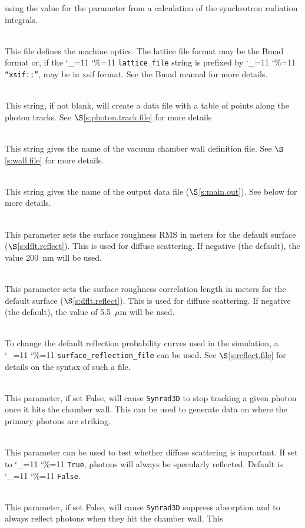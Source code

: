 \documentclass[11pt,openany]{report}
\newcommand{\sref}[1]{$\S$\ref{#1}}
\newcommand{\srthree}{\texttt{Synrad3D}\xspace}
\newcommand\ttcmd{\begingroup\catcode`\_=11 \catcode`\%=11 \dottcmd}
\newcommand\dottcmd[1]{\texttt{#1}\endgroup}
\newcommand{\vn}{\ttcmd}
\newcommand{\Newline}{\hfil \\}
\begin{document}
\begin{description}
using the value for the parameter from a calculation of the synchrotron radiation integrals.
  \item[\vn{lattice_file}] \Newline
This file defines the machine optics. The lattice file format may be
the Bmad format or, if the \vn{lattice_file} string is prefixed by
\vn{``xsif::''}, may be in xsif format. See the Bmad manual for more details.
  \item[\vn{photon_track_file}] \Newline
This string, if not blank, will create a data file with a table of points along the photon tracks.
See \sref{s:photon.track.file} for more details
  \item[\vn{wall_file}] \Newline
This string gives the name of the vacuum chamber wall definition
file. See \sref{s:wall.file} for more details.
  \item[\vn{dat_file}] \Newline
This string gives the name of the output data file (\sref{s:main.out}).
See below for more details.
  \item[\vn{surface_roughness_rms}] \Newline
This parameter sets the surface roughness RMS in meters for the
default surface (\sref{s:dflt.reflect}). This is used for diffuse
scattering.  If negative (the default), the value 200~nm will be used.
  \item[\vn{roughness_correlation_len}] \Newline
This parameter sets the surface roughness correlation length in meters
for the default surface (\sref{s:dflt.reflect}).  This is used for
diffuse scattering.  If negative (the default), the value of
5.5~$\mu$m will be used.
  \item[\vn{surface_reflection_file}] \Newline
To change the default reflection probability curves used in the simulation, a 
\vn{surface_reflection_file} can be used. See \sref{s:reflect.file} for details
on the syntax of such a file.
  \item[\vn{sr3d_params\%allow_reflections}] \Newline
This parameter, if set False, will cause \srthree to stop tracking a given photon once
it hits the chamber wall. This can be used to generate data on where the primary photons are striking.
  \item[\vn{sr3d_params\%specular_reflection_only}] \Newline
This parameter can be used to test whether diffuse scattering is important. If set to \vn{True},
photons will always be specularly reflected. Default is \vn{False}.
  \item[\vn{sr3d_params\%allow_absorption}] \Newline
This parameter, if set False, will cause \srthree suppress absorption
and to always reflect photons when they hit the chamber wall. This

\end{description}
\end{document}
